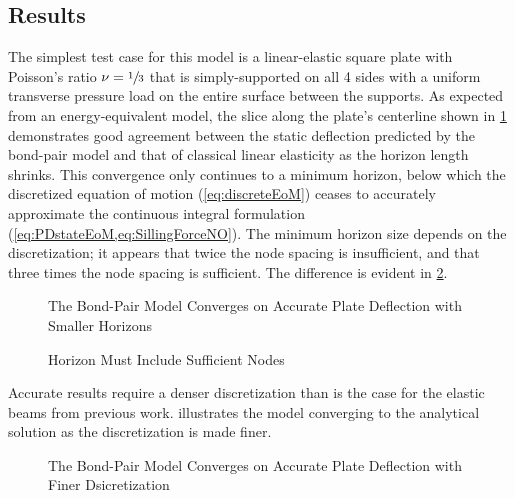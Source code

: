 \documentclass[preprint,review,12pt]{elsarticle}
\newcommand{\plotpath}{./plots}
\begin{document}
\subsection{Results}
The simplest test case for this model is a linear-elastic square plate with Poisson's ratio \(\nu = \sfrac{1}{3}\) that is simply-supported on all 4 sides with a uniform transverse pressure load on the entire surface between the supports.  As expected from an energy-equivalent model, the slice along the plate's centerline shown in \cref{fig:plate_convergence_h} demonstrates good agreement between the static deflection predicted by the bond-pair model and that of classical linear elasticity as the horizon length shrinks.  This convergence only continues to a minimum horizon, below which the discretized equation of motion (\cref{eq:discreteEoM}) ceases to accurately approximate the continuous integral formulation (\cref{eq:PDstateEoM,eq:SillingForceNO}).  The minimum horizon size depends on the discretization; it appears that twice the node spacing is insufficient, and that three times the node spacing is sufficient.  The difference is evident in \cref{fig:plate_minimum_h}.
%
\begin{figure}[h]
  \centering
  \resizebox{0.55\linewidth}{!}{}
  \caption{The Bond-Pair Model Converges on Accurate Plate Deflection with Smaller Horizons}
  \label{fig:plate_convergence_h}
\end{figure}
%
\begin{figure}[h]
  \centering
  \resizebox{0.55\linewidth}{!}{}
  \caption{Horizon Must Include Sufficient Nodes}
  \label{fig:plate_minimum_h}
\end{figure}
%
Accurate results require a denser discretization than is the case for the elastic beams from previous work.   illustrates the model converging to the analytical solution as the discretization is made finer.
%
\begin{figure}[tbp]
  \centering
  \resizebox{0.55\linewidth}{!}{}
  \caption{The Bond-Pair Model Converges on Accurate Plate Deflection with Finer Dsicretization}
  \label{fig:plate_convergence_n}
\end{figure}
\end{document}
